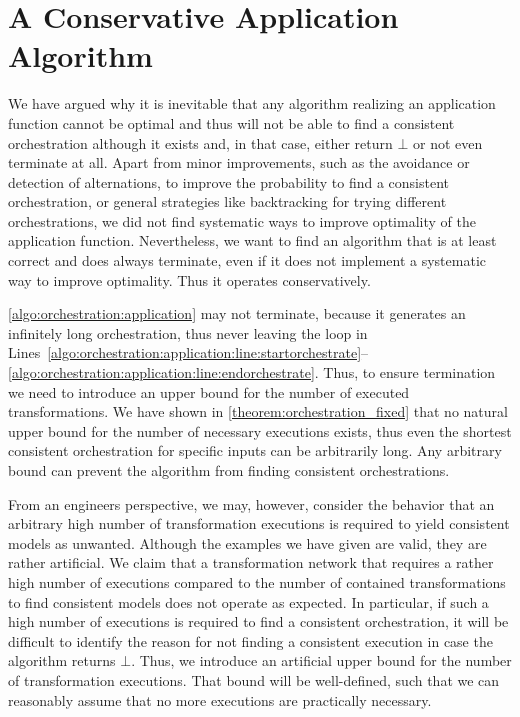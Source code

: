 \section{A Conservative Application Algorithm}
\label{chap:orchestration:algorithm}

We have argued why it is inevitable that any algorithm realizing an application function cannot be optimal and thus will not be able to find a consistent orchestration although it exists and, in that case, either return $\bot$ or not even terminate at all.
Apart from minor improvements, such as the avoidance or detection of alternations, to improve the probability to find a consistent orchestration, or general strategies like backtracking for trying different orchestrations, we did not find systematic ways to improve optimality of the application function.
Nevertheless, we want to find an algorithm that is at least correct and does always terminate, even if it does not implement a systematic way to improve optimality.
Thus it operates conservatively.

\autoref{algo:orchestration:application} may not terminate, because it generates an infinitely long orchestration, thus never leaving the loop in Lines~\ref{algo:orchestration:application:line:startorchestrate}--\ref{algo:orchestration:application:line:endorchestrate}.
Thus, to ensure termination we need to introduce an upper bound for the number of executed transformations.
We have shown in \autoref{theorem:orchestration_fixed} that no natural upper bound for the number of necessary executions exists, thus even the shortest consistent orchestration for specific inputs can be arbitrarily long. %
Any arbitrary bound can prevent the algorithm from finding consistent orchestrations.

From an engineers perspective, we may, however, consider the behavior that an arbitrary high number of transformation executions is required to yield consistent models as unwanted.
Although the examples we have given are valid, they are rather artificial.
We claim that a transformation network that requires a rather high number of executions compared to the number of contained transformations to find consistent models does not operate as expected.
In particular, if such a high number of executions is required to find a consistent orchestration, it will be difficult to identify the reason for not finding a consistent execution in case the algorithm returns $\bot$.
Thus, we introduce an artificial upper bound for the number of transformation executions.
That bound will be well-defined, such that we can reasonably assume that no more executions are practically necessary.

